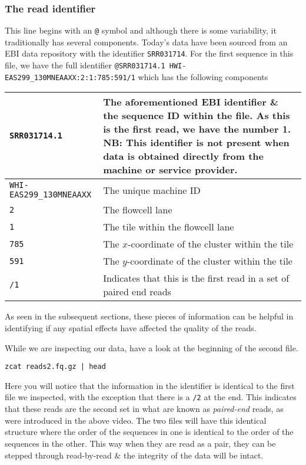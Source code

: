 \subsubsection*{The read identifier}
This line begins with an \texttt{@} symbol and although there is some variability, it traditionally has several components.
Today's data have been sourced from an EBI data repository with the identifier \texttt{SRR031714}.
For the first sequence in this file, we have the full identifier \texttt{@SRR031714.1 HWI-EAS299_130MNEAAXX:2:1:785:591/1} which has the following components \\

\begin{tabular}{|p{5cm} | p{9cm} |}
  \hline
  \texttt{SRR031714.1} & The aforementioned EBI identifier \& the sequence ID within the file. As this is the first read, we have the number 1. NB: This identifier is \textbf{not} present when data is obtained directly from the machine or service provider.\\
  \hline
  \texttt{WHI-EAS299_130MNEAAXX} & The unique machine ID \\
  \hline
  \texttt{2} & The flowcell lane \\
  \hline
  \texttt{1} & The tile within the flowcell lane \\
  \hline
  \texttt{785} & The $x$-coordinate of the cluster within the tile \\
  \hline
  \texttt{591} & The $y$-coordinate of the cluster within the tile \\
  \hline
  \texttt{/1} & Indicates that this is the first read in a set of paired end reads \\
  \hline
\end{tabular}

As seen in the subsequent sections, these pieces of information can be helpful in identifying if any spatial effects have affected the quality of the reads.\\

\begin{steps}
While we are inspecting our data, have a look at the beginning of the second file.
\begin{lstlisting}
zcat reads2.fq.gz | head
\end{lstlisting}
Here you will notice that the information in the identifier is identical to the first file we inspected, with the exception that there is a \texttt{/2} at the end.
This indicates that these reads are the second set in what are known as \textit{paired-end} reads, as were introduced in the above video.
The two files will have this identical structure where the order of the sequences in one is identical to the order of the sequences in the other.
This way when they are read as a pair, they can be stepped through read-by-read \& the integrity of the data will be intact.
\end{steps}


